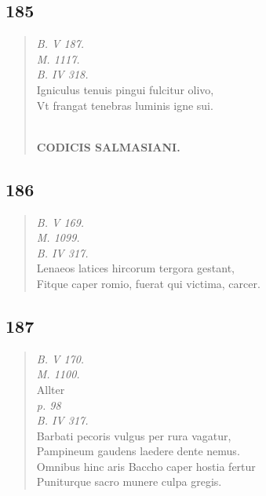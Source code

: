 \documentclass[11pt, a4paper]{report}
\begin{document}
            \subsection*{185}
      \begin{verse}
      \textit{B. V 187.} \\ \textit{M. 1117.} \\ \textit{B. IV 318.} \\ Igniculus tenuis pingui fulcitur olivo, \\ Vt frangat tenebras luminis igne sui. \\ 
        ﻿\pagebreak 
    \begin{center} \textbf{CODICIS SALMASIANI.} \end{center} \marginpar{[157]} 
      \end{verse}
  
            \subsection*{186}
      \begin{verse}
      \textit{B. V 169.} \\ \textit{M. 1099.} \\ \textit{B. IV 317.} \\ Lenaeos latices hircorum tergora gestant, \\ Fitque caper romio, fuerat qui victima, carcer. \\ 
      \end{verse}
  
            \subsection*{187}
      \begin{verse}
      \textit{B. V 170.} \\ \textit{M. 1100.} \\ Allter \\ \textit{p. 98} \\ \textit{B. IV 317.} \\ Barbati pecoris vulgus per rura vagatur, \\ Pampineum gaudens laedere dente nemus. \\ Omnibus hinc aris Baccho caper hostia fertur \\ Puniturque sacro munere culpa gregis. \\ 
      \end{verse}
  
\end{document}
